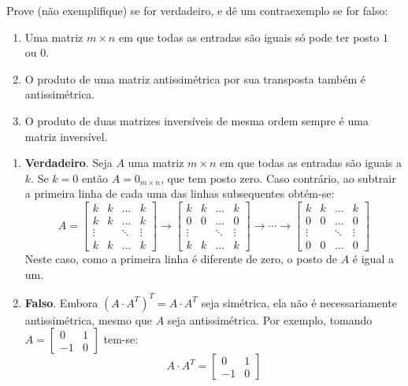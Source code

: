 \documentclass[12pt,a4paper]{article}
\begin{document}
\begin{ExerciseList}
\Exercise[title={2,5}]
Prove (não exemplifique) se for verdadeiro, e dê um contraexemplo se for falso:
\begin{enumerate}
\item Uma matriz $m \times n$ em que todas as entradas são iguais só pode ter posto $1$ ou $0$.
\item O produto de uma matriz antissimétrica por sua transposta também é antissimétrica.
\item O produto de duas matrizes inversíveis de mesma ordem sempre é uma matriz inversível.
\end{enumerate}
\Answer
\begin{enumerate}
\item \textbf{Verdadeiro}. Seja $A$ uma matriz $m \times n$ em que todas as entradas são iguais a $k$. Se $k = 0$ então $A = 0_{m\times n}$, que tem posto zero. Caso contrário, ao subtrair a primeira linha de cada uma das linhas subsequentes obtém-se:
\[
A =
\begin{bmatrix}
k & k & \ldots & k\\
k & k & \ldots & k\\
\vdots & & \ddots & \vdots\\
k & k & \ldots & k
\end{bmatrix}
\rightarrow
\begin{bmatrix}
k & k & \ldots & k\\
0 & 0 & \ldots & 0\\
\vdots & & \ddots & \vdots\\
k & k & \ldots & k
\end{bmatrix}
\rightarrow\cdots
\rightarrow
\begin{bmatrix}
k & k & \ldots & k\\
0 & 0 & \ldots & 0\\
\vdots & & \ddots & \vdots\\
0 & 0 & \ldots & 0
\end{bmatrix}
\]
Neste caso, como a primeira linha é diferente de zero, o posto de $A$ é igual a um.
\item \textbf{Falso}. Embora $(A \cdot A^T)^T = A\cdot A^T$ seja simétrica, ela não é necessariamente antissimétrica, mesmo que $A$ seja antissimétrica. Por exemplo, tomando
$A = \begin{bmatrix}
0 & 1 \\ -1 & 0
\end{bmatrix}$
tem-se:
\[
A \cdot A^T= \begin{bmatrix}
0 & 1 \\ -1 & 0
\end{bmatrix}
\]
\end{enumerate}
\end{ExerciseList}
\end{document}
